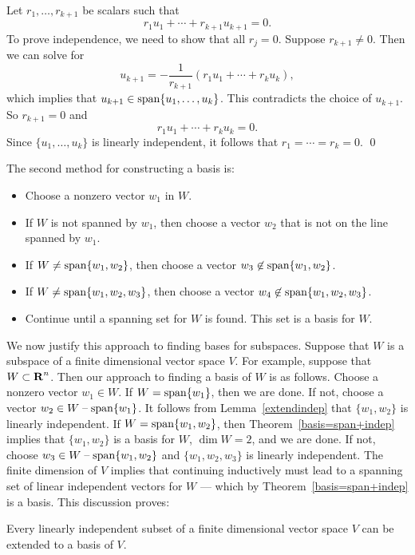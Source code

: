 \documentclass{ximera}
\begin{document}
\proof  Let $r_1,\ldots,r_{k+1}$ be scalars such that
\begin{equation}  \label{rk+1}
r_1u_1 + \cdots + r_{k+1}u_{k+1} = 0.
\end{equation}
To prove independence, we need to show that all $r_j=0$.
Suppose $r_{k+1}\neq 0$.  Then we can solve  for
\[
u_{k+1} = -\frac{1}{r_{k+1}}(r_1u_1+\cdots +r_ku_k),
\]
which implies that $u_{k+1}\in {\rm span}\{u_1,\ldots,u_k\}$.  This
contradicts the choice of $u_{k+1}$.  So $r_{k+1}=0$ and
\[
r_1u_1 + \cdots + r_ku_k = 0.
\]
Since $\{u_1,\ldots,u_k\}$ is linearly independent, it follows
that $r_1=\cdots =r_k=0$.  \qed

The second method for constructing a basis is:
\begin{itemize}
\item        Choose a nonzero vector $w_1$ in $W$.
\item If $W$ is not spanned by $w_1$, then choose a vector $w_2$
that is not on the line spanned by $w_1$.
\item        If $W\neq{\rm span}\{w_1,w_2\}$, then choose a vector
$w_3\not\in
{\rm span}\{w_1,w_2\}$.
\item        If $W\neq{\rm span}\{w_1,w_2,w_3\}$, then choose a vector
$w_4\not\in
{\rm span}\{w_1,w_2,w_3\}$.
\item Continue until a spanning set for $W$ is
found.  This set is a basis for $W$.
\end{itemize}

We now justify this approach to finding bases for subspaces.
Suppose that $W$ is a subspace of a finite dimensional vector
space $V$.  For example, suppose that $W\subset\mbox{$\bf{R}$}^n$. Then
our approach to finding a basis of $W$ is as follows.  Choose a
nonzero vector $w_1\in W$.  If $W={\rm span}\{w_1\}$, then we are
done.  If not, choose a vector $w_2\in W\;\mbox{--}\;{\rm span}\{w_1\}$.
It follows from Lemma~\ref{extendindep} that $\{w_1,w_2\}$ is
linearly independent.  If $W={\rm span}\{w_1,w_2\}$, then
Theorem~\ref{basis=span+indep} implies that $\{w_1,w_2\}$ is
a basis for $W$, $\dim W=2$, and we are done.  If not, choose
$w_3\in W\;\mbox{--}\;{\rm span}\{w_1,w_2\}$ and $\{w_1,w_2,w_3\}$ is
linearly independent.  The finite dimension of $V$ implies that
continuing inductively must lead to a spanning set of linear
independent vectors for $W$ --- which by
Theorem~\ref{basis=span+indep} is a basis. This discussion proves:
\begin{cor}  \label{c:extendindependent}
Every linearly independent subset of a finite dimensional vector
space $V$ can be extended to a basis of $V$.
\end{cor}
\end{document}
